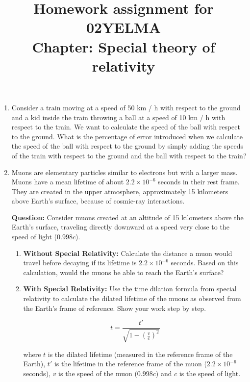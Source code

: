 \documentclass[12pt]{article}
\title{Homework assignment for 02YELMA \\ Chapter: Special theory of relativity}
\begin{document}
\date{}
\maketitle
\vspace{-0.8in}

\begin{enumerate}
    \item Consider a train moving at a speed of 50 km / h with respect to the ground and a kid inside the train throwing a ball at a speed of 10 km / h with respect to the train. We want to calculate the speed of the ball with respect to the ground. What is the percentage of error introduced when we calculate the speed of the ball with respect to the ground by simply adding the speeds of the train with respect to the ground and the ball with respect to the train?
    \item Muons are elementary particles similar to electrons but with a larger mass. Muons have a mean lifetime of about $2.2 \times 10^{-6}$ seconds in their rest frame. They are created in the upper atmosphere, approximately 15 kilometers above Earth's surface, because of cosmic-ray interactions.
    
    \textbf{Question:}
    Consider muons created at an altitude of 15 kilometers above the Earth's surface, traveling directly downward at a speed very close to the speed of light ($0.998c$).
    
    \begin{enumerate}
        \item \textbf{Without Special Relativity:}
        Calculate the distance a muon would travel before decaying if its lifetime is $2.2 \times 10^{-6}$ seconds. Based on this calculation, would the muons be able to reach the Earth's surface?
        
        \item \textbf{With Special Relativity:}
        Use the time dilation formula from special relativity to calculate the dilated lifetime of the muons as observed from the Earth's frame of reference. Show your work step by step.
        
        \begin{equation*}
            t = \frac{t'}{\sqrt{1 - \left(\frac{v}{c}\right)^2}}
        \end{equation*}
        
        where $t$ is the dilated lifetime (measured in the reference frame of the Earth), $t'$ is the lifetime in the reference frame of the muon ($2.2 \times 10^{-6}$ seconds), $v$ is the speed of the muon ($0.998c$) and $c$ is the speed of light.
        

\end{enumerate}
\end{enumerate}
\end{document}

